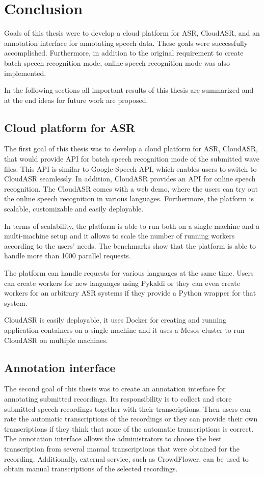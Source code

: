 \chapter*{Conclusion}

Goals of this thesis were to develop a cloud platform for ASR, CloudASR,
  and an annotation interface for annotating speech data.
These goals were successfully accomplished.
Furthermore, in addition to the original requirement to create batch speech recognition mode,
  online speech recognition mode was also implemented.

In the following sections all important results of this thesis are summarized and
  at the end ideas for future work are proposed.

\section*{Cloud platform for ASR}
The first goal of this thesis was to develop a cloud platform for ASR, CloudASR,
  that would provide API for batch speech recognition mode of the submitted wave files.
This API is similar to Google Speech API,
  which enables users to switch to CloudASR seamlessly.
In addition, CloudASR provides an API for online speech recognition.
The CloudASR comes with a web demo,
  where the users can try out the online speech recognition in various languages.
Furthermore, the platform is scalable, customizable and easily deployable.


In terms of scalability,
  the platform is able to run both on a single machine and a multi-machine setup
  and it allows to scale the number of running workers according to the users' needs.
The benchmarks show that the platform is able to handle more than 1000 parallel requests.

The platform can handle requests for various languages at the same time.
Users can create workers for new languages using Pykaldi
  or they can even create workers for an arbitrary ASR systems
  if they provide a Python wrapper for that system.

CloudASR is easily deployable,
  it uses Docker for creating and running application containers on a single machine
  and it uses a Mesos cluster to run CloudASR on multiple machines.


\section*{Annotation interface}
The second goal of this thesis was to create an annotation interface for annotating submitted recordings.
Its responsibility is to collect and store submitted speech recordings together with their transcriptions.
Then users can rate the automatic transcriptions of the recordings
  or they can provide their own transcriptions
  if they think that none of the automatic transcriptions is correct.
The annotation interface allows the administrators to choose the best transcription from several manual transcriptions
  that were obtained for the recording.
Additionally, external service, such as CrowdFlower, can be used to obtain manual transcriptions of the selected recordings.

